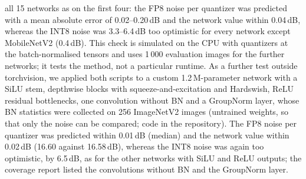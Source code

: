 \documentclass[pdflatex,sn-mathphys-num]{sn-jnl}%
\theoremstyle{thmstyleone}%
\theoremstyle{thmstyletwo}%
\theoremstyle{thmstylethree}%
\begin{document}
all 15 networks as on the first four: the FP8 noise per quantizer was predicted with a mean absolute error of 0.02--0.20\,dB and the network value within 0.04\,dB, whereas the INT8 noise was 3.3--6.4\,dB too optimistic for every network except MobileNetV2 (0.4\,dB). This check is simulated on the CPU with quantizers at the batch-normalised tensors and uses 1\,000 evaluation images for the further networks; it tests the method, not a particular runtime. As a further test outside torchvision, we applied both scripts to a custom 1.2\,M-parameter network with a SiLU stem, depthwise blocks with squeeze-and-excitation and Hardswish, ReLU residual bottlenecks, one convolution without BN and a GroupNorm layer, whose BN statistics were collected on 256 ImageNetV2 images (untrained weights, so that only the noise can be compared; code in the repository). The FP8 noise per quantizer was predicted within 0.01\,dB (median) and the network value within 0.02\,dB (16.60 against 16.58\,dB), whereas the INT8 noise was again too optimistic, by 6.5\,dB, as for the other networks with SiLU and ReLU outputs; the coverage report listed the convolutions without BN and the GroupNorm layer.
\end{document}
